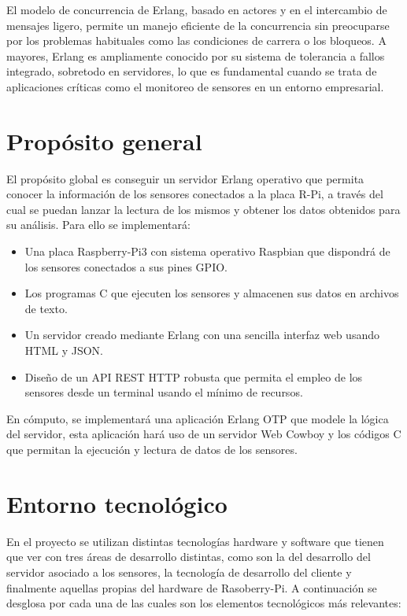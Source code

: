 El modelo de concurrencia de Erlang, basado en actores y en el intercambio de mensajes ligero, permite un manejo eficiente de la concurrencia sin preocuparse por los problemas habituales como las condiciones de carrera o los bloqueos. A mayores, Erlang es ampliamente conocido por su sistema de tolerancia a fallos integrado, sobretodo en servidores, lo que es fundamental cuando se trata de aplicaciones críticas como el monitoreo de sensores en un entorno empresarial.

\section{Propósito general}

El propósito global es conseguir un servidor Erlang operativo que permita conocer la información de los sensores conectados a la placa R-Pi, a través del cual se puedan lanzar la lectura de los mismos y obtener los datos obtenidos para su análisis. Para ello se implementará:

\begin{itemize}

    \item Una placa Raspberry-Pi3 con sistema operativo Raspbian que dispondrá de los sensores conectados a sus pines GPIO.
    
    \item Los programas C que ejecuten los sensores y almacenen sus datos en archivos de texto.
    
    \item Un servidor creado mediante Erlang con una sencilla interfaz web usando HTML y JSON.
    
    \item Diseño de un API REST HTTP robusta que permita el empleo de los sensores desde un terminal usando el mínimo de recursos.
\end{itemize}

En cómputo, se implementará una aplicación Erlang OTP que modele la lógica del servidor, esta aplicación hará uso de un servidor Web Cowboy y los códigos C que permitan la ejecución y lectura de datos de los sensores.

\section{Entorno tecnológico}

En el proyecto se utilizan distintas tecnologías hardware y software que tienen que ver con tres áreas de desarrollo distintas, como son la del desarrollo del servidor asociado a los sensores, la tecnología de desarrollo del cliente y finalmente aquellas propias del hardware de Rasoberry-Pi. A continuación se desglosa por cada una de las cuales son los elementos tecnológicos más relevantes:

